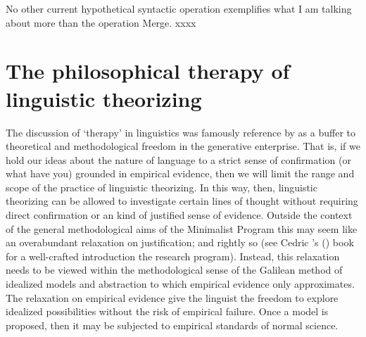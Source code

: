 \documentclass[11pt]{article}
\newcommand{\posscitet}[1]{\citeauthor{#1}'s (\citeyear{#1})}
\begin{document}
No other current hypothetical syntactic operation exemplifies what I am talking about more than the operation Merge. xxxx 




\section{The philosophical therapy of linguistic theorizing}
The discussion of `therapy' in linguistics was famously reference by \cite{chomsky95mp} as a buffer to theoretical and methodological freedom in the generative enterprise. That is, if we hold our ideas about the nature of language to a strict sense of confirmation (or what have you) grounded in empirical evidence, then we will limit the range and scope of the practice of linguistic theorizing. In this way, then, linguistic theorizing can be allowed to investigate certain lines of thought without requiring direct confirmation or an kind of justified sense of evidence. Outside the context of the general methodological aims of the Minimalist Program this may seem like an overabundant relaxation on justification; and rightly so (see Cedric \posscitet{boeckx06linguisticmin} book for a well-crafted introduction the research program). Instead, this relaxation needs to be viewed within the methodological sense of the Galilean method of idealized models and abstraction to which empirical evidence only approximates. The relaxation on empirical evidence give the linguist the freedom to explore idealized possibilities without the risk of empirical failure. Once a model is proposed, then it may be subjected to empirical standards of normal science.   
\end{document}
